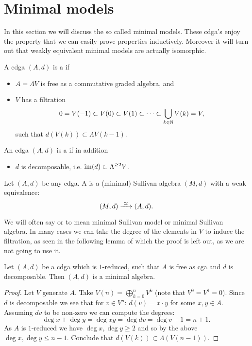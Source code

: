 
\chapter{Minimal models}
\label{sec:minimal-models}

In this section we will discuss the so called minimal models. These cdga's enjoy the property that we can easily prove properties inductively. Moreover it will turn out that weakly equivalent minimal models are actually isomorphic.

\begin{definition}
	A cdga $(A, d)$ is a  if
	\begin{itemize}
		\item $A = \Lambda V$ is free as a commutative graded algebra, and
		\item $V$ has a filtration
		$$ 0 = V(-1) \subset V(0) \subset V(1) \subset \cdots \subset \bigcup_{k \in \mathbb{N}} V(k) = V, $$
		such that $d(V(k)) \subset \Lambda V(k-1)$.
	\end{itemize}

	An cdga $(A, d)$ is a  if in addition
	\begin{itemize}
		\item $d$ is decomposable, i.e. $\operatorname*{im}(d) \subset \Lambda^{\geq 2}V$.
	\end{itemize}
\end{definition}

\begin{definition}
	Let $(A, d)$ be any cdga. A  is a (minimal) Sullivan algebra $(M, d)$ with a weak equivalence:
	$$ (M, d) \xrightarrow{\,\,{\simeq}\,\,} (A, d). $$
\end{definition}

We will often say  or  to mean minimal Sullivan model or minimal Sullivan algebra. In many cases we can take the degree of the elements in $V$ to induce the filtration, as seen in the following lemma of which the proof is left out, as we are not going to use it.

\begin{lemma}
	Let $(A, d)$ be a cdga which is $1$-reduced, such that $A$ is free as cga and $d$ is decomposable. Then $(A, d)$ is a minimal algebra.
\end{lemma}
\begin{proof}
	Let $V$ generate $A$. Take $V(n) = \bigoplus_{k=0}^n V^k$ (note that $V^0 = V^1 = 0$). Since $d$ is decomposable we see that for $v \in V^n$: $d(v) = x \cdot y$ for some $x, y \in A$. Assuming $dv$ to be non-zero we can compute the degrees:
	$$ \deg{x} + \deg{y} = \deg{xy} = \deg{dv} = \deg{v} + 1 = n + 1. $$
	As $A$ is $1$-reduced we have $\deg{x}, \deg{y} \geq 2$ and so by the above $\deg{x}, \deg{y} \leq n-1$. Conclude that $d(V(k)) \subset \Lambda(V(n-1))$.
\end{proof}


